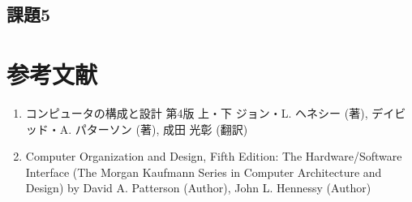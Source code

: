 \documentclass[a4j]{jarticle}
\begin{document}



\subsection{課題5}





%
%

\section{参考文献}

\begin{enumerate}
\item コンピュータの構成と設計 第4版 上・下 ジョン・L. ヘネシー (著), デイビッド・A. パターソン (著), 成田 光彰 (翻訳)
\item Computer Organization and Design, Fifth Edition: The Hardware/Software Interface (The Morgan Kaufmann Series in Computer Architecture and Design) by David A. Patterson (Author), John L. Hennessy  (Author)
\end{enumerate}
\end{document}
